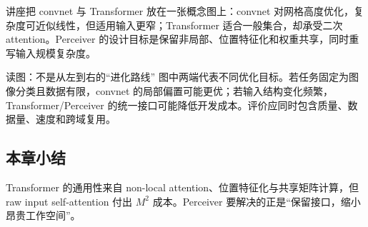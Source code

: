 讲座把 convnet 与 Transformer 放在一张概念图上：convnet 对网格高度优化，复杂度可近似线性，但适用输入更窄；Transformer 适合一般集合，却承受二次 attention。Perceiver 的设计目标是保留非局部、位置特征化和权重共享，同时重写输入规模复杂度。


\begin{knowledgebox}{读图：不是从左到右的“进化路线”}
图中两端代表不同优化目标。若任务固定为图像分类且数据有限，convnet 的局部偏置可能更优；若输入结构变化频繁，Transformer/Perceiver 的统一接口可能降低开发成本。评价应同时包含质量、数据量、速度和跨域复用。
\end{knowledgebox}

\subsection{本章小结}

Transformer 的通用性来自 non-local attention、位置特征化与共享矩阵计算，但 raw input self-attention 付出 $M^2$ 成本。Perceiver 要解决的正是“保留接口，缩小昂贵工作空间”。

